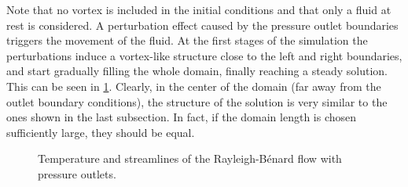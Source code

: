 Note that no vortex is included in the initial conditions and that only a fluid at rest is considered. A perturbation effect caused by the pressure outlet boundaries triggers the movement of the fluid. At the first stages of the simulation the perturbations induce a vortex-like structure close to the left and right boundaries, and start gradually filling the whole domain, finally reaching a steady solution. This can be seen in \cref{fig:RayBerUnsteadySol}. Clearly, in the center of the domain (far away from the outlet boundary conditions), the structure of the solution is very similar to the ones shown in the last subsection. In fact, if the domain length is chosen sufficiently large, they should be equal. 
\begin{figure}[t]
	\centering
	\pgfplotsset{width=0.96\textwidth, compat=1.3}
	\par\bigskip%
	\par\bigskip%
	\par\bigskip%
	\par\bigskip%
	\par\bigskip%
	\par\bigskip%
	\par\bigskip%
	\par\bigskip%
	\caption{Temperature and streamlines of the Rayleigh-Bénard flow with pressure outlets.}\label{fig:RayBerUnsteadySol}
\end{figure}
\FloatBarrier